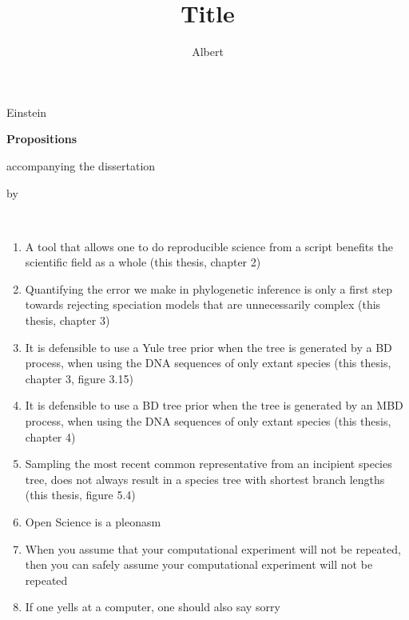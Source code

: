 \documentclass{dissertation}
\begin{document}
\title[Optional Subtitle]{Title}
\author{Albert}{Einstein}

\begin{center}

{\Large\titlefont\bfseries Propositions}

\bigskip

accompanying the dissertation

\bigskip

{\makeatletter
\titlestyle\bfseries\large\@title
\makeatother}

{\makeatletter
\ifx\@subtitle\undefined\else
    \titlefont\titleshape\@subtitle
\fi
\makeatother}

\bigskip

by

\bigskip

\makeatletter
{\large\titlefont\bfseries\@firstname\ {\titleshape\@lastname}}
\makeatother

\end{center}

\bigskip
\bigskip

\begin{enumerate}

\item A tool that allows one to do reproducible science from a script
      benefits the scientific field as a whole (this thesis, chapter 2)
\item Quantifying the error we make in phylogenetic inference is
      only a first step towards rejecting speciation models that are
      unnecessarily complex (this thesis, chapter 3)
\item It is defensible to use a Yule tree prior when the tree
      is generated by a BD process, when using the DNA sequences
      of only extant species (this thesis, chapter 3, figure 3.15)
\item It is defensible to use a BD tree prior when the tree
      is generated by an MBD process, when using the DNA sequences
      of only extant species (this thesis, chapter 4)
\item Sampling the most recent common representative from an incipient
      species tree, does not always result in a species tree with shortest
      branch lengths (this thesis, figure 5.4)
\item Open Science is a pleonasm
\item When you assume that your computational experiment will not be repeated,
      then you can safely assume your computational experiment will not be repeated
\item If one yells at a computer, one should also say sorry
\end{enumerate}
\end{document}
